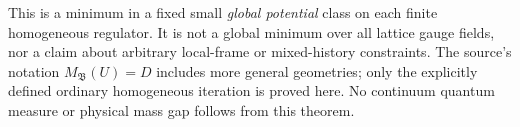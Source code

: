 This is a minimum in a fixed small \emph{global potential}
class on each finite homogeneous regulator. It is not a
global minimum over all lattice gauge fields, nor a claim
about arbitrary local-frame or mixed-history constraints.
The source's notation $M_{\mathfrak B}(U)=D$ includes more
general geometries; only the explicitly defined ordinary
homogeneous iteration is proved here. No continuum quantum
measure or physical mass gap follows from this theorem.
